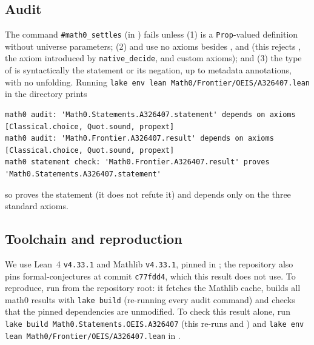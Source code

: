 \documentclass[11pt]{amsart}
\theoremstyle{plain}
\theoremstyle{definition}
\begin{document}
\subsection*{Audit}
The command \texttt{\#math0\_settles} (in ) fails unless (1)  is a \texttt{Prop}-valued definition without universe parameters; (2)  and  use no axioms besides ,  and  (this rejects , the axiom  introduced by \texttt{native\_decide}, and custom axioms); and (3) the type of  is syntactically the statement or its negation, up to metadata annotations, with no unfolding.
Running \texttt{lake env lean Math0/Frontier/OEIS/A326407.lean} in the directory  prints
\begin{lstlisting}[basicstyle=\ttfamily\scriptsize]
math0 audit: 'Math0.Statements.A326407.statement' depends on axioms [Classical.choice, Quot.sound, propext]
math0 audit: 'Math0.Frontier.A326407.result' depends on axioms [Classical.choice, Quot.sound, propext]
math0 statement check: 'Math0.Frontier.A326407.result' proves 'Math0.Statements.A326407.statement'
\end{lstlisting}
so  proves the statement (it does not refute it) and depends only on the three standard axioms.

\subsection*{Toolchain and reproduction}
We use Lean~4 \cite{Lean4} \texttt{v4.33.1} and Mathlib \cite{Mathlib} \texttt{v4.33.1}, pinned in ; the repository also pins formal-conjectures \cite{FC} at commit \texttt{c77fdd4}, which this result does not use.
To reproduce, run  from the repository root: it fetches the Mathlib cache, builds all math0 results with \texttt{lake build} (re-running every audit command) and checks that the pinned dependencies are unmodified.
To check this result alone, run \texttt{lake build Math0.Statements.OEIS.A326407} (this re-runs  and ) and \texttt{lake env lean Math0/Frontier/OEIS/A326407.lean} in .
\end{document}
